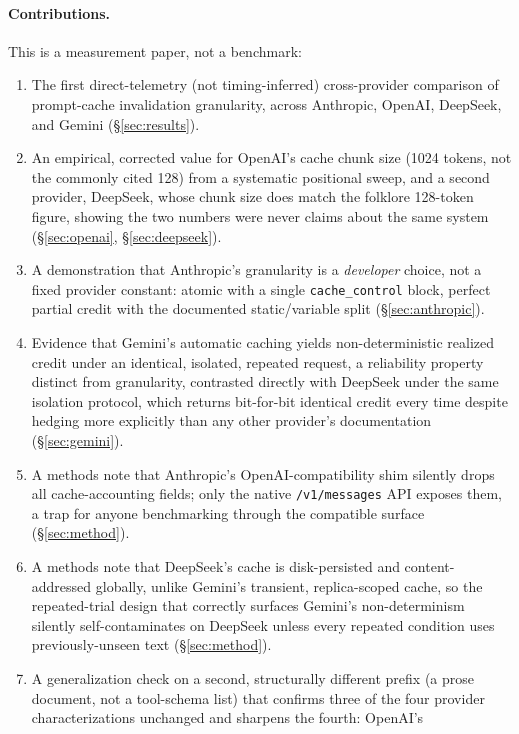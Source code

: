 \documentclass[11pt]{article}
\newcommand{\code}[1]{\texttt{#1}}
\begin{document}
\paragraph{Contributions.} This is a measurement paper, not a benchmark:
\begin{enumerate}
  \item The first direct-telemetry (not timing-inferred) cross-provider
  comparison of prompt-cache invalidation granularity, across Anthropic,
  OpenAI, DeepSeek, and Gemini (\S\ref{sec:results}).
  \item An empirical, corrected value for OpenAI's cache chunk size (1024
  tokens, not the commonly cited 128) from a systematic positional sweep, and
  a second provider, DeepSeek, whose chunk size does match the folklore
  128-token figure, showing the two numbers were never claims about the same
  system (\S\ref{sec:openai}, \S\ref{sec:deepseek}).
  \item A demonstration that Anthropic's granularity is a \emph{developer}
  choice, not a fixed provider constant: atomic with a single
  \code{cache\_control} block, perfect partial credit with the documented
  static/variable split (\S\ref{sec:anthropic}).
  \item Evidence that Gemini's automatic caching yields non-deterministic
  realized credit under an identical, isolated, repeated request, a
  reliability property distinct from granularity, contrasted directly with
  DeepSeek under the same isolation protocol, which returns bit-for-bit
  identical credit every time despite hedging more explicitly than any other
  provider's documentation (\S\ref{sec:gemini}).
  \item A methods note that Anthropic's OpenAI-compatibility shim silently
  drops all cache-accounting fields; only the native \code{/v1/messages} API
  exposes them, a trap for anyone benchmarking through the compatible
  surface (\S\ref{sec:method}).
  \item A methods note that DeepSeek's cache is disk-persisted and
  content-addressed globally, unlike Gemini's transient, replica-scoped
  cache, so the repeated-trial design that correctly surfaces Gemini's
  non-determinism silently self-contaminates on DeepSeek unless every
  repeated condition uses previously-unseen text (\S\ref{sec:method}).
  \item A generalization check on a second, structurally different prefix (a
  prose document, not a tool-schema list) that confirms three of the four
  provider characterizations unchanged and sharpens the fourth: OpenAI's

\end{enumerate}
\end{document}

